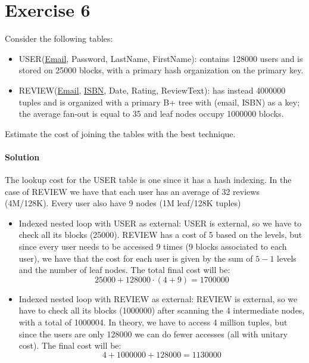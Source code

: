 \section{Exercise 6}

Consider the following tables: 
\begin{itemize}
    \item USER(\underline{Email}, Password, LastName, FirstName): contains 128000 users and is stored on 25000 blocks, with a primary hash organization on the primary key.
    \item REVIEW(\underline{Email}, \underline{ISBN}, Date, Rating, ReviewText): has instead 4000000 tuples and is organized with a primary B+ tree with (email, ISBN) as a key; the average fan-out is equal to 35 and leaf nodes occupy 1000000 blocks.
\end{itemize}
Estimate the cost of joining the tables with the best technique.

\paragraph*{Solution}
The lookup cost for the USER table is one since it has a hash indexing. 
In the case of REVIEW we have that each user has an average of 32 reviews (4M/128K). 
Every user also have 9 nodes (1M leaf/128K tuples)
\begin{itemize}
    \item Indexed nested loop with USER as external:
        USER is external, so we have to check all its blocks (25000).
        REVIEW has a cost of 5 based on the levels, but since every user needs to be accessed 9 times (9 blocks associated to each user), we have that the cost for each user is given by the sum of $5-1$ levels and the number of leaf nodes. 
        The total final cost will be: 
        \[25000 + 128000 \cdot (4 + 9) = 1700000\]
    \item Indexed nested loop with REVIEW as external:
        REVIEW is external, so we have to check all its blocks (1000000) after scanning the 4 intermediate nodes, with a total of 1000004.
        In theory, we have to access 4 million tuples, but since the users are only 128000 we can do fewer accesses (all with unitary cost).
        The final cost will be: 
        \[4 + 1000000 + 128000 = 1130000\]
\end{itemize}